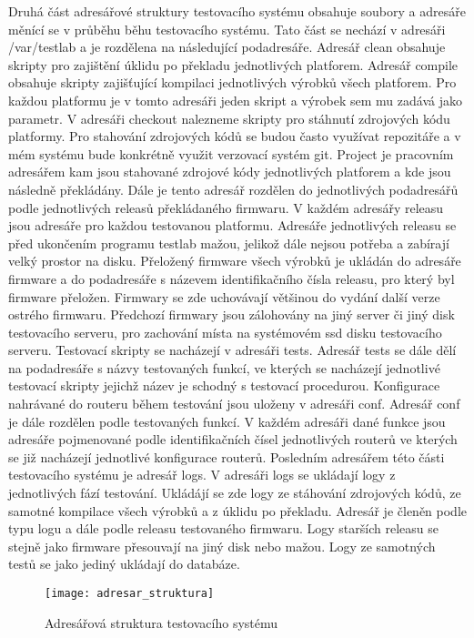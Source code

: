 Druhá část adresářové struktury testovacího systému obsahuje soubory a adresáře měnící se v průběhu běhu testovacího systému. Tato část se nechází v adresáři /var/testlab a je rozdělena na následující podadresáře. Adresář clean obsahuje skripty pro zajištění úklidu po překladu jednotlivých platforem. Adresář compile obsahuje skripty zajišťující kompilaci jednotlivých výrobků všech platforem. Pro každou platformu je v tomto adresáři jeden skript a výrobek sem mu zadává jako parametr. V adresáři checkout nalezneme skripty pro stáhnutí zdrojových kódu platformy. Pro stahování zdrojových kódů se budou často využívat repozitáře a v mém systému bude konkrétně využit verzovací systém git. Project je pracovním adresářem kam jsou stahované zdrojové kódy jednotlivých platforem a kde jsou následně překládány. Dále je tento adresář rozdělen do jednotlivých podadresářů podle jednotlivých releasů překládaného firmwaru. V každém adresářy releasu jsou adresáře pro každou testovanou platformu. Adresáře jednotlivých releasu se před ukončením programu testlab mažou, jelikož dále nejsou potřeba a zabírají velký prostor na disku. Přeložený firmware všech výrobků je ukládán do adresáře firmware a do podadresáře s názevem identifikačního čísla releasu, pro který byl firmware přeložen. Firmwary se zde uchovávají většinou do vydání další verze ostrého firmwaru. Předchozí firmwary jsou zálohovány na jiný server či jiný disk testovacího serveru, pro zachování místa na systémovém ssd disku testovacího serveru. Testovací skripty se nacházejí v adresáři tests. Adresář tests se dále dělí na podadresáře s názvy testovaných funkcí, ve kterých se nacházejí jednotlivé testovací skripty jejichž název je schodný s testovací procedurou. Konfigurace nahrávané do routeru během testování jsou uloženy v adresáři conf. Adresář conf je dále rozdělen podle testovaných funkcí. V každém adresáři dané funkce jsou adresáře pojmenované podle identifikačních čísel jednotlivých routerů ve kterých se již nacházejí jednotlivé konfigurace routerů. Posledním adresářem této části testovacího systému je adresář logs. V adresáři logs se ukládají logy z jednotlivých fází testování. Ukládájí se zde logy ze stáhování zdrojových kódů, ze samotné kompilace všech výrobků a z úklidu po překladu. Adresář je členěn podle typu logu a dále podle releasu testovaného firmwaru. Logy starších releasu se stejně jako firmware přesouvají na jiný disk nebo mažou. Logy ze samotných testů se jako jediný ukládají do databáze.

\begin{figure}[h]
  \centering
  \texttt{[image: adresar\_struktura]}
  \caption{Adresářová struktura testovacího systému}
  \label{fig:adresar_struktura}
\end{figure}

